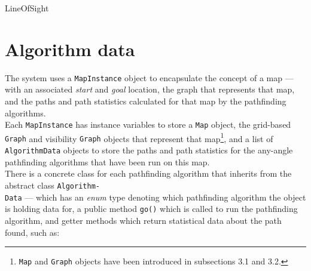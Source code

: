 \documentclass[12pt,notitlepage]{report}
\begin{document}
\begin{algorithm}
  \SetAlgoLined\DontPrintSemicolon
  \caption{{\sc LineOfSight}}
\end{algorithm} 

\section{Algorithm data}
The system uses a {\tt MapInstance} object to encapsulate the concept of a map --- with an associated {\em start} and {\em goal} location, the graph that represents that map, and the paths and path statistics calculated for that map by the pathfinding algorithms.\\

\noindent
Each {\tt MapInstance} has instance variables to store a {\tt Map} object, the grid-based {\tt Graph} and visibility {\tt Graph} objects that represent that map\footnote{{\tt Map} and {\tt Graph} objects have been introduced in subsections 3.1 and 3.2.}, and a list of {\tt AlgorithmData} objects to store the paths and path statistics for the any-angle pathfinding algorithms that have been run on this map.\\

\noindent
There is a concrete class for each pathfinding algorithm that inherits from the abstract class {\tt Algorithm-}\\{\tt Data} --- which  has an {\em enum} type denoting which pathfinding algorithm the object is holding data for, a public method {\tt go()} which is called to run the pathfinding algorithm, and getter methods which return statistical data about the path found, such as:
\end{document}
